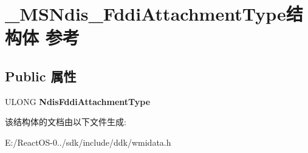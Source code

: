 \hypertarget{struct___m_s_ndis___fddi_attachment_type}{}\section{\+\_\+\+M\+S\+Ndis\+\_\+\+Fddi\+Attachment\+Type结构体 参考}
\label{struct___m_s_ndis___fddi_attachment_type}
\subsection*{Public 属性}
\begin{DoxyCompactItemize}
\item 
\mbox{\label{struct___m_s_ndis___fddi_attachment_type_a580fdb127ca70d818bb069150327f958}} 
U\+L\+O\+NG {\bfseries Ndis\+Fddi\+Attachment\+Type}
\end{DoxyCompactItemize}


该结构体的文档由以下文件生成\+:\begin{DoxyCompactItemize}
\item 
E\+:/\+React\+O\+S-\/0../sdk/include/ddk/wmidata.\+h\end{DoxyCompactItemize}
